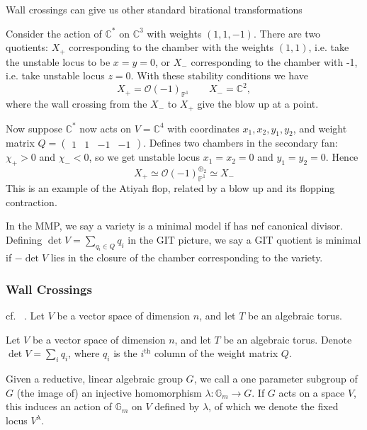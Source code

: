Wall crossings can give us other standard birational transformations

\begin{example}{}{}
Consider the action of $\mathbb{C}^{*}$ on $\mathbb{C}^3$ with weights $(1,1,-1)$. 
There are two quotients: $X_+$ corresponding to the chamber with the weights $(1,1)$, i.e. take the unstable locus to be $x=y= 0$, or $X_-$ corresponding to the chamber with -1, i.e. take unstable locus $z = 0$. With these stability conditions we have $$
X_{+}= \mathcal{O}(-1)_{\mathbb{P}^{1}} \qquad X_{-}= \mathbb{C}^2, $$ where the wall crossing from the $X_-$ to $X_+$ give the blow up at a point. 

Now suppose $\mathbb{C}^*$ now acts on $V = \mathbb{C}^4$  with coordinates $x_{1}, x_{2}, y_{1},y_{2}$, and weight matrix $Q = \begin{pmatrix}1&1&-1&-1\end{pmatrix}$. 
Defines two chambers in the secondary fan: $\chi_{+}>0$ and $\chi_{-}<0$, so we get unstable locus $x_{1}= x_{2}= 0$ and $y_{1}= y_{2}=0$. Hence $$
X_{+}\simeq \mathcal{O}(-1)_{\mathbb{P}^{1}}^{\oplus_{2}}\simeq X_-
$$This is an example of the Atiyah flop, related by a blow up and its flopping contraction. 
\end{example}


In the MMP, we say a variety is a minimal model if has nef canonical divisor. Defining $\det V = \sum_{q_{i}\in Q}q_i$ in the GIT picture, we  say a GIT quotient is minimal if $-\det V$ lies in the closure of the chamber corresponding to the variety. 

\subsubsection{Wall Crossings}

cf. ~\cite*{Kite_2022,ballard2014variation}. Let $V$ be a vector space of dimension $n$, and let $T$ be an algebraic torus.

Let $V$ be a vector space of dimension $n$, and let $T$ be an algebraic torus. Denote $\det V = \sum_i q_i$, where $q_i$ is the $i^\mathrm{th}$ column of the weight matrix $Q$. 

\begin{definition}{}{}
    Given a reductive, linear algebraic group $G$, we call a one parameter subgroup of $G$ (the image of) an injective homomorphism $\lambda : \mathbb{G}_{m}\to G$. If $G$ acts on a space $V$, this induces an action of $\mathbb{G}_m$ on $V$ defined by $\lambda$, of which we denote the fixed locus $V^\lambda$. 
\end{definition}

